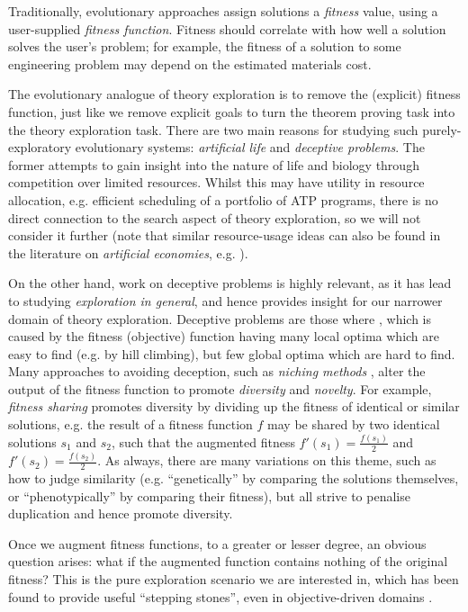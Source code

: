 \documentclass[]{article}
\begin{document}
Traditionally, evolutionary approaches assign solutions a \emph{fitness} value, using a user-supplied \emph{fitness function}. Fitness should correlate with how well a solution solves the user's problem; for example, the fitness of a solution to some engineering problem may depend on the estimated materials cost.

The evolutionary analogue of theory exploration is to remove the (explicit) fitness function, just like we remove explicit goals to turn the theorem proving task into the theory exploration task. There are two main reasons for studying such purely-exploratory evolutionary systems: \emph{artificial life} and \emph{deceptive problems}. The former attempts to gain insight into the nature of life and biology through competition over limited resources. Whilst this may have utility in resource allocation, e.g. efficient scheduling of a portfolio of ATP programs, there is no direct connection to the search aspect of theory exploration, so we will not consider it further (note that similar resource-usage ideas can also be found in the literature on \emph{artificial economies}, e.g. \cite{baum2000evolution}).

On the other hand, work on deceptive problems is highly relevant, as it has lead to studying \emph{exploration in general}, and hence provides insight for our narrower domain of theory exploration. Deceptive problems are those where  \cite{lehman2011abandoning}, which is caused by the fitness (objective) function having many local optima which are easy to find (e.g. by hill climbing), but few global optima which are hard to find. Many approaches to avoiding deception, such as \emph{niching methods} \cite{sareni1998fitness}, alter the output of the fitness function to promote \emph{diversity} and \emph{novelty}. For example, \emph{fitness sharing} promotes diversity by dividing up the fitness of identical or similar solutions, e.g. the result of a fitness function $f$ may be shared by two identical solutions $s_1$ and $s_2$, such that the augmented fitness $f'(s_1) = \frac{f(s_1)}{2}$ and $f'(s_2) = \frac{f(s_2)}{2}$. As always, there are many variations on this theme, such as how to judge similarity (e.g. ``genetically'' by comparing the solutions themselves, or ``phenotypically'' by comparing their fitness), but all strive to penalise duplication and hence promote diversity.

Once we augment fitness functions, to a greater or lesser degree, an obvious question arises: what if the augmented function contains nothing of the original fitness? This is the pure exploration scenario we are interested in, which has been found to provide useful ``stepping stones'', even in objective-driven domains \cite{lehman2011abandoning} \cite{hutter2002fitness}.
\end{document}
